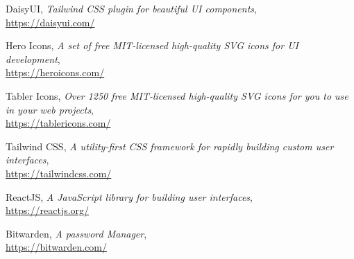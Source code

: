 \documentclass[11pt]{article}
\begin{document}
\clearpage
\begin{thebibliography}{5}

    DaisyUI, \emph{Tailwind CSS plugin for beautiful UI components},\\ \url{https://daisyui.com/}

    Hero Icons, \emph{A set of free MIT-licensed high-quality SVG icons for UI development}, \\
    \url{https://heroicons.com/}

    Tabler Icons, \emph{Over 1250 free MIT-licensed high-quality SVG icons for you to use in your web projects},\\
    \url{https://tablericons.com/}

    Tailwind CSS, \emph{A utility-first CSS framework for rapidly building custom user interfaces},\\
    \url{https://tailwindcss.com/}

    ReactJS, \emph{A JavaScript library for building user interfaces},\\ \url{https://reactjs.org/}

    Bitwarden, \emph{A password Manager},\\ \url{https://bitwarden.com/}

\end{thebibliography}
\end{document}
